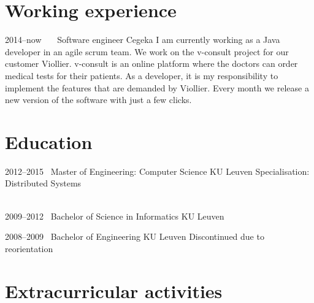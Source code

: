 \documentclass[a4paper]{friggeri-cv} %
\begin{document}
\section{Working experience}
\begin{entrylist}
\entry
{2014--now~~~}
{Software engineer}
{Cegeka}
{I am currently working as a Java developer in an agile scrum team. We work on the v-consult project for our customer Viollier. v-consult is an online platform where the doctors can order medical tests for their patients.
As a developer, it is my responsibility to implement the features that are demanded by Viollier. Every month we release a new version of the software with just a few clicks.}

\end{entrylist}

\section{Education}

\begin{entrylist}
\entry
{2012--2015~}
{Master of Engineering: Computer Science}
{KU Leuven}
{Specialisation: Distributed Systems\\
~}


\entry
{2009--2012~}
{Bachelor of Science in Informatics}
{KU Leuven}
{~}

\entry
{2008--2009~}
{Bachelor of Engineering}
{KU Leuven}
{Discontinued due to reorientation}
\end{entrylist}



\section{Extracurricular activities}
\end{document}
